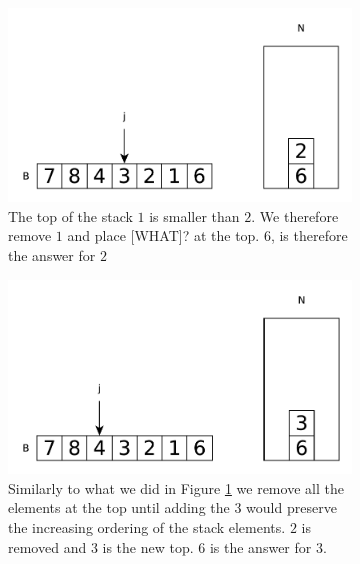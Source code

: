 \begin{figure}
\begin{subfigure}[t]{0.49\textwidth}
\begin{framed}
			\includegraphics[width=1\linewidth]{sources/next_greater_element/images/stack3}
		\end{framed}
		\caption{The top of the stack $1$ is smaller than $2$. We therefore remove $1$ and place [WHAT]? at the top. $6$, is therefore the answer for $2$}
		\label{fig:next_greater:variation1:stack3}
	 \end{subfigure}
	 \hfill
	 \begin{subfigure}[t]{0.49\textwidth}
		\begin{framed}
			\includegraphics[width=1\linewidth]{sources/next_greater_element/images/stack4}
		\end{framed}
		\caption{Similarly to what we did in Figure \ref{fig:next_greater:variation1:stack3} we remove all the elements at the top until adding the $3$ would preserve the increasing ordering of the stack elements. $2$ is removed and $3$ is the new top. $6$ is the answer for $3$.}
		\label{fig:next_greater:variation1:stack4}
	 \end{subfigure}
	 \hfill
	 \begin{subfigure}[t]{0.49\textwidth}
		\begin{framed}

\end{framed}
\end{subfigure}
\end{figure}
